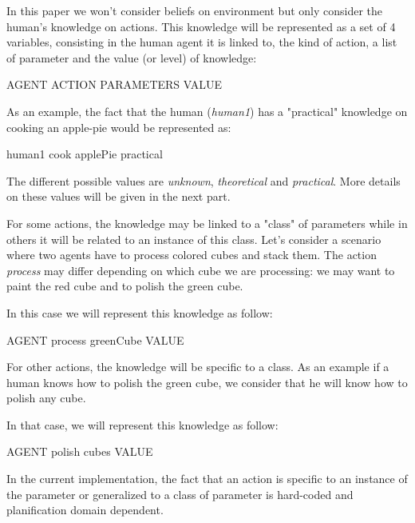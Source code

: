 \documentclass{llncs}
\begin{document}
In this paper we won't consider beliefs on environment but only consider the human's knowledge on actions. This knowledge will be represented as a set of 4 variables, consisting in the human agent it is linked to, the kind of action, a list of parameter and the value (or level) of knowledge:

AGENT ACTION PARAMETERS VALUE

As an example, the fact that the human (\textit{human1}) has a "practical" knowledge on cooking an apple-pie would be represented as:

human1 cook applePie practical

The different possible values are \textit{unknown}, \textit{theoretical} and \textit{practical}. More details on these values will be given in the next part.

For some actions, the knowledge may be linked to a "class" of parameters while in others it will be related to an instance of this class.
Let's consider a scenario where two agents have to process colored cubes and stack them.
The action \textit{process} may differ depending on which cube we are processing: we may want to paint the red cube and to polish the green cube. %

In this case we will represent this knowledge as follow:

AGENT process greenCube VALUE

For other actions, the knowledge will be specific to a class. As an example if a human knows how to polish the green cube, we consider that he will know how to polish any cube.


In that case, we will represent this knowledge as follow:

AGENT polish cubes VALUE

In the current implementation, the fact that an action is specific to an instance of the parameter or generalized to a class of parameter is hard-coded and planification domain dependent.

\end{document}
